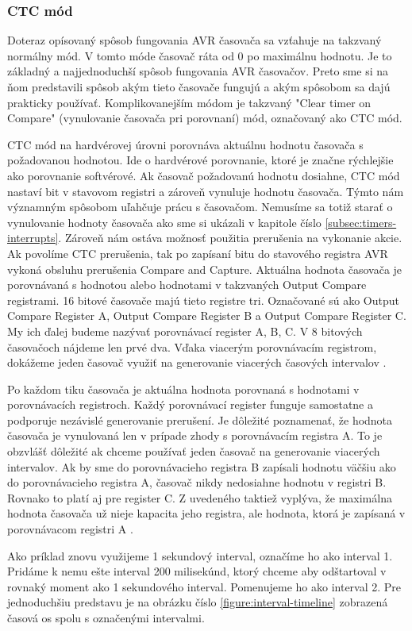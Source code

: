 \subsubsection{CTC mód} \label{subsec:ctc-mode}
Doteraz opísovaný spôsob fungovania AVR časovača sa vzťahuje na takzvaný normálny  mód. V tomto móde časovač ráta od 0 po maximálnu hodnotu.
Je to základný a najjednoduchší spôsob fungovania AVR časovačov. Preto sme si na ňom predstavili spôsob akým tieto časovače fungujú a akým spôsobom sa dajú prakticky
používať. Komplikovanejším módom je takzvaný "Clear timer on Compare" (vynulovanie časovača pri porovnaní) mód, označovaný ako CTC mód. \par
CTC mód na hardvérovej úrovni porovnáva aktuálnu hodnotu časovača s požadovanou hodnotou. Ide o hardvérové porovnanie, ktoré je značne rýchlejšie ako porovnanie
softvérové. Ak časovač požadovanú hodnotu dosiahne, CTC mód nastaví bit v stavovom registri
a zároveň vynuluje hodnotu časovača. Týmto nám významným spôsobom uľahčuje prácu s časovačom. Nemusíme sa totiž starať o vynulovanie hodnoty časovača ako sme si ukázali
v kapitole číslo \ref{subsec:timers-interrupts}. Zároveň nám ostáva možnosť použitia prerušenia na vykonanie akcie. Ak povolíme CTC prerušenia, tak po zapísaní bitu
do stavového registra AVR vykoná obsluhu prerušenia Compare and Capture. Aktuálna hodnota časovača je porovnávaná s hodnotou alebo hodnotami v takzvaných Output Compare registrami.
16 bitové časovače majú tieto registre tri. Označované sú ako Output Compare Register A, Output Compare Register B a Output Compare Register C. My ich ďalej budeme nazývať
porovnávací register A, B, C. V 8 bitových časovačoch nájdeme len prvé dva. Vďaka viacerým porovnávacím registrom, dokážeme jeden časovač využiť na generovanie viacerých
časových intervalov \cite{atmelATmega64012801281}. \par
Po každom tiku časovača je aktuálna hodnota  porovnaná s hodnotami v porovnávacích registroch. Každý porovnávací register funguje
samostatne a podporuje nezávislé generovanie prerušení. Je dôležité poznamenať, že hodnota časovača je vynulovaná len v prípade zhody s porovnávacím registra A.
To je obzvlášť dôležité ak chceme používať jeden časovač na generovanie viacerých intervalov. Ak by sme do porovnávacieho registra B zapísali hodnotu väčšiu ako
do porovnávacieho registra A, časovač nikdy nedosiahne hodnotu v registri B. Rovnako to platí aj pre register C. Z uvedeného taktiež vyplýva, že maximálna hodnota
časovača už nieje kapacita jeho registra, ale hodnota, ktorá je zapísaná v porovnávacom registri A \cite{atmelATmega64012801281}. \par
Ako príklad znovu využijeme 1 sekundový interval, označíme ho ako interval 1.
Pridáme k nemu ešte interval 200 milisekúnd, ktorý chceme aby odštartoval v rovnaký moment ako 1 sekundového interval. Pomenujeme ho ako interval 2. Pre jednoduchšiu
predstavu je na obrázku číslo \ref{figure:interval-timeline} zobrazená časová os spolu s označenými intervalmi.


